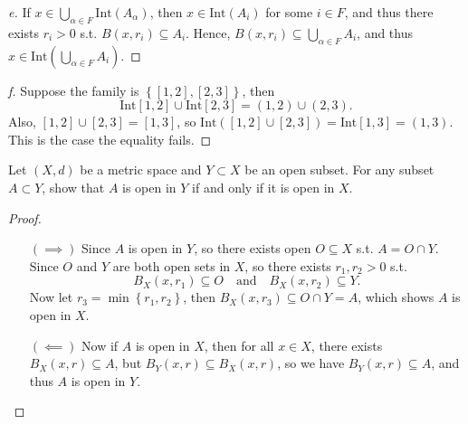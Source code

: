 \begin{proof}[e]
  If \(x \in \bigcup_{\alpha \in F} \mathrm{Int}(A_\alpha )  \), then \(x \in \mathrm{Int}(A_i) \) for some \(i \in F\), and thus there exists \(r_i > 0\) s.t. \(B(x, r_i) \subseteq A_i\). Hence, \(B(x, r_i) \subseteq \bigcup_{\alpha \in F} A_i \), and thus \(x \in \mathrm{Int}\left( \bigcup_{\alpha \in F}A_i  \right)  \).       
\end{proof}
\begin{proof}[f]
  Suppose the family is \(\left\{ [1, 2], [2, 3] \right\} \), then 
  \[
    \mathrm{Int}[1, 2] \cup \mathrm{Int}[2, 3] = (1, 2) \cup (2, 3).  
  \]
  Also, \([1, 2] \cup [2, 3] = [1, 3]\), so \(\mathrm{Int}\left( [1,2] \cup [2, 3] \right) = \mathrm{Int}[1, 3] = (1, 3)   \). This is the case the equality fails. 
\end{proof}
\begin{problem}
    Let $(X, d)$ be a metric space and $Y \subset X$ be an open subset. For any subset $A \subset Y$, show
that $A$ is open in $Y$ if and only if it is open in $X$.
\end{problem}
\begin{proof}
  \vphantom{text}
  \begin{itemize}
    \item [\((\implies )\)] Since \(A\) is open in \(Y\), so there exists open \(O \subseteq X\) s.t. \(A = O \cap Y\). Since \(O\) and \(Y\) are both open sets in \(X\), so there exists \(r_1, r_2 > 0\) s.t. 
    \[
      B_X (x, r_1) \subseteq O \quad \text{and} \quad B_X(x, r_2) \subseteq Y.
    \]
    Now let \(r_3 = \min \left\{ r_1, r_2  \right\} \), then \(B_X(x, r_3) \subseteq O \cap Y = A\), which shows \(A\) is open in \(X\). 
    \item [\((\impliedby )\)]  Now if \(A\) is open in \(X\), then for all \(x \in X\), there exists \(B_X(x, r) \subseteq A\), but \(B_Y (x, r) \subseteq B_X(x, r)\), so we have \(B_Y(x, r) \subseteq A\), and thus \(A\) is open in \(Y\).                     
  \end{itemize}
\end{proof}

